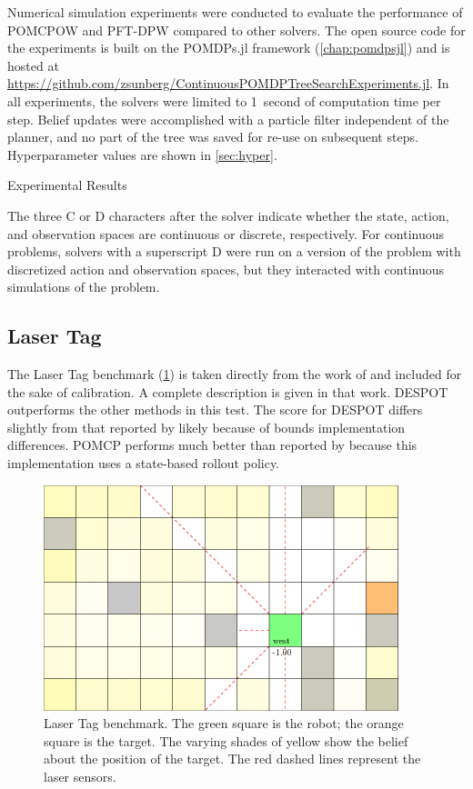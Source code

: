 Numerical simulation experiments were conducted to evaluate the performance of POMCPOW and PFT-DPW compared to other solvers.
The open source code for the experiments is built on the POMDPs.jl framework (\cref{chap:pomdpsjl}) and is hosted at \url{https://github.com/zsunberg/ContinuousPOMDPTreeSearchExperiments.jl}.
In all experiments, the solvers were limited to \SI{1}{second} of computation time per step. Belief updates were accomplished with a particle filter independent of the planner, and no part of the tree was saved for re-use on subsequent steps.
Hyperparameter values are shown in \cref{sec:hyper}.

\begin{table}
    {
        \caption{Experimental Results} \label{tab:experiments}

        
    }
    \vspace{5mm}
    \footnotesize{The three C or D characters after the solver indicate whether the state, action, and observation spaces are continuous or discrete, respectively. For continuous problems, solvers with a superscript D were run on a version of the problem with discretized action and observation spaces, but they interacted with continuous simulations of the problem.}
\end{table}

\subsection{Laser Tag}

The Laser Tag benchmark (\cref{fig:lasertag}) is taken directly from the work of \citet{somani2013despot} and included for the sake of calibration. A complete description is given in that work. DESPOT outperforms the other methods in this test. The score for DESPOT differs slightly from that reported by \citet{somani2013despot} likely because of bounds implementation differences.
POMCP performs much better than reported by \citet{somani2013despot} because this implementation uses a state-based rollout policy.

\begin{figure}[htpb]
    \centering
    \includegraphics[width=0.6\linewidth]{media/lasertag.png}
    \caption[Laser Tag benchmark]{Laser Tag benchmark. The green square is the robot; the orange square is the target. The varying shades of yellow show the belief about the position of the target. The red dashed lines represent the laser sensors.}
    \label{fig:lasertag}
\end{figure}

